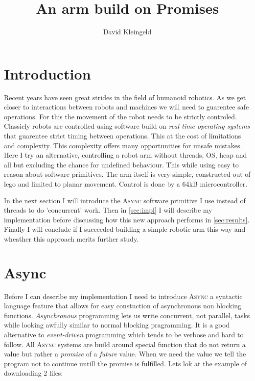 \documentclass[lang=en, hanging-titles=true]{skrapport}
\title{An arm build on Promises}
\author[dskleingeld@gmail.com]{David Kleingeld}
\begin{document}
\maketitle
\tableofcontents

\section{Introduction}
Recent years have seen great strides in the field of humanoid robotics. As we get closer to interactions between robots and machines we will need to guarentee safe operations. For this the movement of the robot needs to be strictly controled. Classicly robots are controlled using software build on \textit{real time operating systems} that guarentee strict timing between operations. This at the cost of limitations and complexity. This complexity offers many opportunities for unsafe mistakes. Here I try an alternative, controlling a robot arm without threads, OS, heap and all but excluding the chance for undefined behaviour. This while using easy to reason about software primitives. The arm itself is very simple, constructed out of lego and limited to planar movement. Control is done by a 64kB microcontroller.

In the next section I will introduce the \textsc{Async} software primitive I use instead of threads to do 'concurrent' work. Then in \cref{sec:impl} I will describe my implementation before discussing how this new approach performs in \cref{sec:results}. Finally I will conclude if I succeeded building a simple robotic arm this way and wheather this approach merits further study.

\section{Async}
Before I can describe my implementation I need to introduce \textsc{Async} a syntactic language feature that allows for easy constuction of asynchronous non blocking functions. \textit{Asynchronous} programming lets us write concurrent, not parallel, tasks while looking awfully similar to normal blocking pragramming. It is a good alternative to \textit{event-driven} programming which tends to be verbose and hard to follow. All \textsc{Async} systems are build around special function that do not return a value but rather a \textit{promise} of a \textit{future} value. When we need the value we tell the program not to continue untill the promise is fulfilled. Lets lok at the example of downloading 2 files:
\end{document}
